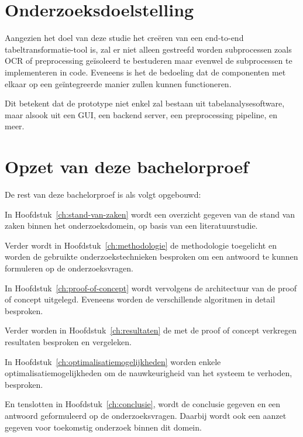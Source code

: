 \section{Onderzoeksdoelstelling}
\label{sec:onderzoeksdoelstelling}

Aangezien het doel van deze studie het creëren van een end-to-end tabeltransformatie-tool is, zal er niet alleen gestreefd worden subprocessen zoals \Gls{OCR} of preprocessing geïsoleerd te bestuderen maar evenwel de subprocessen te implementeren in code. Eveneens is het de bedoeling dat de componenten met elkaar op een geïntegreerde manier zullen kunnen functioneren.

Dit betekent dat de prototype niet enkel zal bestaan uit tabelanalysesoftware, maar alsook uit een \Gls{GUI}, een backend server, een preprocessing pipeline, en meer. 

\section{Opzet van deze bachelorproef}
\label{sec:opzet-bachelorproef}


De rest van deze bachelorproef is als volgt opgebouwd:

In Hoofdstuk~\ref{ch:stand-van-zaken} wordt een overzicht gegeven van de stand van zaken binnen het onderzoeksdomein, op basis van een literatuurstudie.

Verder wordt in Hoofdstuk~\ref{ch:methodologie} de methodologie toegelicht en worden de gebruikte onderzoekstechnieken besproken om een antwoord te kunnen formuleren op de onderzoeksvragen.

In Hoofdstuk~\ref{ch:proof-of-concept} wordt vervolgens de architectuur van de proof of concept uitgelegd. Eveneens worden de verschillende algoritmen in detail besproken.

Verder worden in Hoofdstuk~\ref{ch:resultaten} de met de proof of concept verkregen resultaten besproken en vergeleken.

In Hoofdstuk~\ref{ch:optimalisatiemogelijkheden} worden enkele optimalisatiemogelijkheden om de nauwkeurigheid van het systeem te verhoden, besproken.

En tenslotten in Hoofdstuk~\ref{ch:conclusie},  wordt de conclusie gegeven en een antwoord geformuleerd op de onderzoeksvragen. Daarbij wordt ook een aanzet gegeven voor toekomstig onderzoek binnen dit domein.


